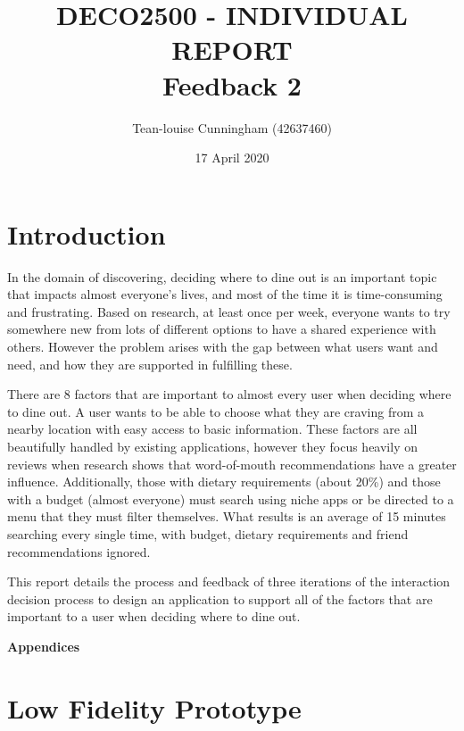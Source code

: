 \documentclass[a4 paper, 12pt]{article}
\title{DECO2500 - INDIVIDUAL REPORT \\ Feedback 2}
\author{Tean-louise Cunningham (42637460)}
\date{17 April 2020}
\begin{document}
\maketitle

\pagebreak
\tableofcontents

\pagebreak
\section{Introduction}
In the domain of discovering, deciding where to dine out is an important topic that impacts almost everyone’s lives, and most of the time it is time-consuming and frustrating. Based on research, at least once per week, everyone wants to try somewhere new from lots of different options to have a shared experience with others. However the problem arises with the gap between what users want and need, and how they are supported in fulfilling these. 

There are 8 factors that are important to almost every user when deciding where to dine out. A user wants to be able to choose what they are craving from a nearby location with easy access to basic information. These factors are all beautifully handled by existing applications, however they focus heavily on reviews when research shows that word-of-mouth recommendations have a greater influence. Additionally, those with dietary requirements (about 20\%) and those with a budget (almost everyone) must search using niche apps or be directed to a menu that they must filter themselves. What results is an average of 15 minutes searching every single time, with budget, dietary requirements and friend recommendations ignored.

This report details the process and feedback of three iterations of the interaction decision process to design an application to support all of the factors that are important to a user when deciding where to dine out. 



%



\appendix
\addappheadtotoc

\pagebreak
\begin{center}
    \Huge \textbf{Appendices}
    \section{Low Fidelity Prototype}
\end{center}
\end{document}
